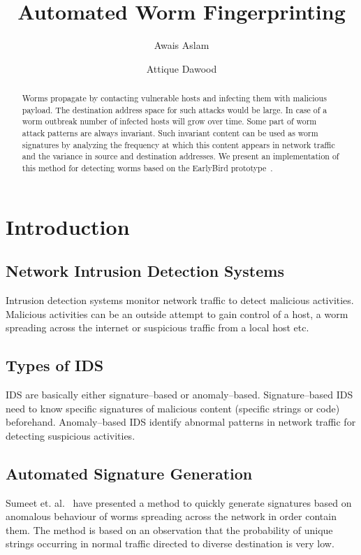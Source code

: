 \documentclass{report}
\begin{document}
\title{Automated Worm Fingerprinting}
\author{Awais Aslam \and Attique Dawood}
\maketitle

\tableofcontents

\begin{abstract}
Worms propagate by contacting vulnerable hosts and infecting them with malicious payload.
The destination address space for such attacks would be large. In case of a worm outbreak
number of infected hosts will grow over time. Some part of worm attack patterns are always
invariant. Such invariant content can be used as worm signatures by analyzing the frequency
at which this content appears in network traffic and the variance in source and destination
addresses. We present an implementation of this method for detecting worms based on the
EarlyBird prototype~\cite{DBLP:conf/osdi/SinghEVS04}.
\end{abstract}

\chapter{Introduction}
\section{Network Intrusion Detection Systems}

Intrusion detection systems monitor network traffic to detect malicious activities. Malicious activities can be an outside attempt to gain control of a host, a worm spreading across the internet or suspicious traffic from a local host etc.

\section{Types of IDS}

IDS are basically either signature--based or anomaly--based. Signature--based IDS need to know specific signatures of malicious content (specific strings or code) beforehand. Anomaly--based IDS identify abnormal patterns in network traffic for detecting suspicious activities.

\section{Automated Signature Generation}

Sumeet et. al.~\cite{DBLP:conf/osdi/SinghEVS04} have presented a method to quickly generate signatures based on anomalous behaviour of worms spreading across the network in order contain them. The method is based on an observation that the probability of unique strings occurring in normal traffic directed to diverse destination is very low.
\end{document}

